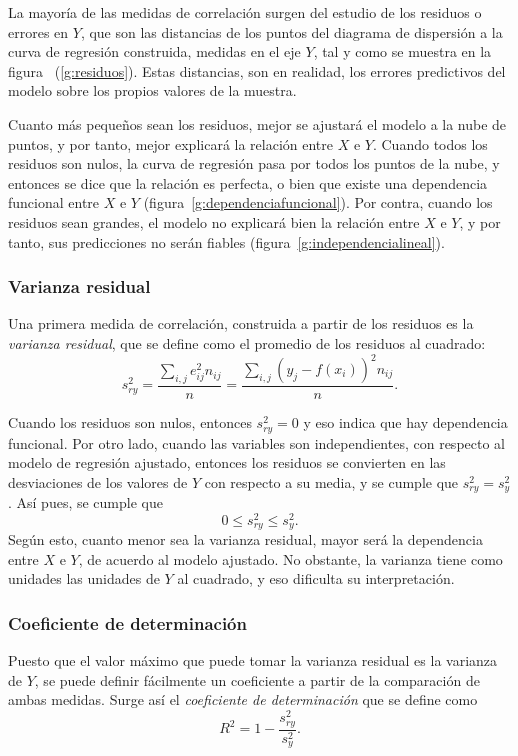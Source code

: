 La mayoría de las medidas de correlación surgen del estudio de los residuos o errores en $Y$, que son las distancias de
los puntos del diagrama de dispersión a la curva de regresión construida, medidas en el eje $Y$, tal y como se muestra
en la figura ~(\ref{g:residuos}).
Estas distancias, son en realidad, los errores predictivos del modelo sobre los propios valores de la muestra.

Cuanto más pequeños sean los residuos, mejor se ajustará el modelo a la nube de puntos, y por tanto, mejor explicará la
relación entre $X$ e $Y$.
Cuando todos los residuos son nulos, la curva de regresión pasa por todos los puntos de la nube, y entonces se dice que
la relación es perfecta, o bien que existe una dependencia funcional entre $X$ e $Y$
(figura~\ref{g:dependenciafuncional}).
Por contra, cuando los residuos sean grandes, el modelo no explicará bien la relación entre $X$ e $Y$, y por tanto, sus
predicciones no serán fiables (figura~\ref{g:independencialineal}).


\subsubsection{Varianza residual}
Una primera medida de correlación, construida a partir de los residuos es la \emph{varianza residual}, que se define
como el promedio de los residuos al cuadrado:
\[
s^2_{ry}=\frac{\sum_{i,j} e_{ij}^2 n_{ij}}{n}= \frac{\sum_{i,j} (y_j-f(x_i))^2
n_{ij}}{n}.
\]

Cuando los residuos son nulos, entonces $s^2_{ry}=0$ y eso indica que hay dependencia funcional.
Por otro lado, cuando las variables son independientes, con respecto al modelo de regresión ajustado, entonces los
residuos se convierten en las desviaciones de los valores de $Y$ con respecto a su media, y se cumple que
$s^2_{ry}=s_y^2$.
Así pues, se cumple que \[  0 \leq s^2_{ry}\leq s_y^2. \] Según esto, cuanto menor sea la varianza residual, mayor será
la dependencia entre $X$ e $Y$, de acuerdo al modelo ajustado.
No obstante, la varianza tiene como unidades las unidades de $Y$ al cuadrado, y eso dificulta su interpretación.


\subsubsection{Coeficiente de determinación}
Puesto que el valor máximo que puede tomar la varianza residual es la varianza de $Y$, se puede definir fácilmente un
coeficiente a partir de la comparación de ambas medidas. 
Surge así el \emph{coeficiente de determinación} que se define como
\[
R^2=1-\frac{s^2_{ry}}{s_y^2}.
\]

